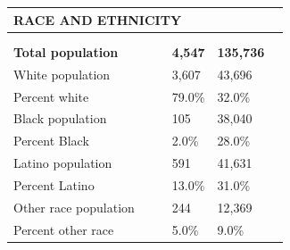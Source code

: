 \documentclass[9pt]{report}
\begin{document}
\vspace{12pt}
\setlength{\tabcolsep}{.01in} %
\begin{tabular}{p{.10in}p{.10in}p{.10in}p{3.7in}>{\hfill}p{.85in}>{\hfill}p{.85in}>{\hfill}p{.85in}>{\hfill}p{.85in}p{0.1in}}
\multicolumn{9}{l}{\parbox{7.1in}{\raggedright{\large{\strut\textbf{RACE AND ETHNICITY}\strut}}}} \\ 
\hline
\multicolumn{4}{l}{\parbox{3.5in}{\raggedright{\textbf{}}}} & \multicolumn{1}{r}{\parbox{.85in}{\strut\raggedleft{\textbf{}\strut}}} & \multicolumn{1}{r}{\parbox{.85in}{\strut\raggedleft{\textbf{}\strut}}} & \multicolumn{1}{r}{\parbox{.85in}{\strut{}}} & \multicolumn{1}{r}{\parbox{.85in}{\strut{}}} & \\ 
\multicolumn{9}{l}{} \\ 
\multicolumn{4}{l}{\parbox{3.5in}{\strut\raggedright{\textbf{Total population}\strut}}} & \textbf{} & \textbf{} & \textbf{4,547} & \textbf{135,736} & \textbf{} \\ 
\multicolumn{4}{l}{\parbox{3.6in}{\strut\raggedright{{White population}}\strut}} &  &  & 3,607 & 43,696 & \multicolumn{1}{l}{}  \\ 
\multicolumn{4}{l}{\parbox{3.6in}{\strut\raggedright{{Percent white}}\strut}} &  &  & 79.0\% & 32.0\% & \multicolumn{1}{l}{}  \\ 
\multicolumn{4}{l}{\parbox{3.6in}{\strut\raggedright{{Black population}}\strut}} &  &  & 105 & 38,040 & \multicolumn{1}{l}{}  \\ 
\multicolumn{4}{l}{\parbox{3.6in}{\strut\raggedright{{Percent Black}}\strut}} &  &  & 2.0\% & 28.0\% & \multicolumn{1}{l}{}  \\ 
\multicolumn{4}{l}{\parbox{3.6in}{\strut\raggedright{{Latino population}}\strut}} &  &  & 591 & 41,631 & \multicolumn{1}{l}{}  \\ 
\multicolumn{4}{l}{\parbox{3.6in}{\strut\raggedright{{Percent Latino}}\strut}} &  &  & 13.0\% & 31.0\% & \multicolumn{1}{l}{}  \\ 
\multicolumn{4}{l}{\parbox{3.6in}{\strut\raggedright{{Other race population}}\strut}} &  &  & 244 & 12,369 & \multicolumn{1}{l}{}  \\ 
\multicolumn{4}{l}{\parbox{3.6in}{\strut\raggedright{{Percent other race}}\strut}} &  &  & 5.0\% & 9.0\% & \multicolumn{1}{l}{}  \\ 

\end{tabular}
\setlength{\tabcolsep}{6pt} %
\end{document}
